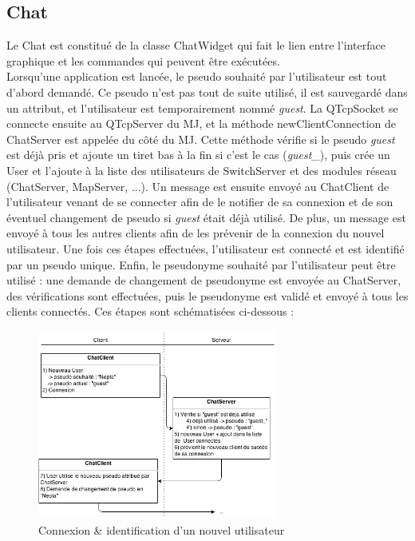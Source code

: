 \subsection{Chat}


Le Chat est constitué de la classe ChatWidget qui fait le lien entre l'interface graphique et les commandes qui peuvent être exécutées.\\

Lorsqu'une application est lancée, le pseudo souhaité par l'utilisateur est tout d'abord demandé. Ce pseudo n'est pas tout de suite utilisé, il est sauvegardé dans un attribut, et l'utilisateur est temporairement nommé \emph{guest}. La QTcpSocket se connecte ensuite au QTcpServer du MJ, et la méthode newClientConnection de ChatServer est appelée du côté du MJ. Cette méthode vérifie si le pseudo \emph{guest} est déjà pris et ajoute un tiret bas à la fin si c'est le cas (\emph{guest\_}), puis crée un User et l'ajoute à la liste des utilisateurs de SwitchServer et des modules réseau (ChatServer, MapServer, ...). Un message est ensuite envoyé au ChatClient de l'utilisateur venant de se connecter afin de le notifier de sa connexion et de son éventuel changement de pseudo si \emph{guest} était déjà utilisé. De plus, un message est envoyé à tous les autres clients afin de les prévenir de la connexion du nouvel utilisateur. Une fois ces étapes effectuées, l'utilisateur est connecté et est identifié par un pseudo unique. Enfin, le pseudonyme souhaité par l'utilisateur peut être utilisé : une demande de changement de pseudonyme est envoyée au ChatServer, des vérifications sont effectuées, puis le pseudonyme est validé et envoyé à tous les clients connectés. Ces étapes sont schématisées ci-dessous :

\begin{figure}[h!]
	\centering
	\includegraphics[width=0.7\textwidth]{img/chat_connection.png}
	\caption{Connexion \& identification d'un nouvel utilisateur}
\end{figure}

